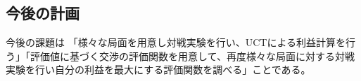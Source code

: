 \documentclass[a4, 10pt,dvipdfmx,twocolumn]{jsarticle}
\begin{document}
\subsection{今後の計画}
今後の課題は
「様々な局面を用意し対戦実験を行い、UCTによる利益計算を行う」「評価値に基づく交渉の評価関数を用意して、再度様々な局面に対する対戦実験を行い自分の利益を最大にする評価関数を調べる」ことである。





 
\end{document}
